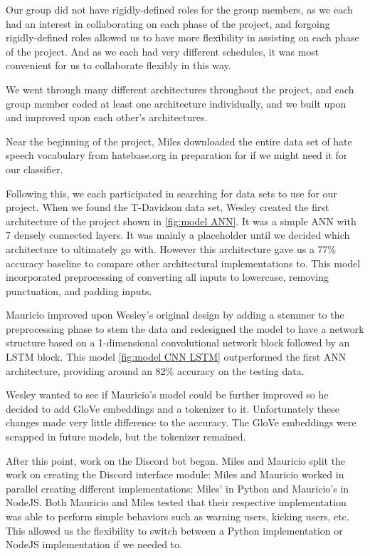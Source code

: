 \documentclass[conference]{sig-alternate-05-2015}
\begin{document}
Our group did not have rigidly-defined roles for the group members, as we each had an interest in collaborating on each phase of the project, and forgoing rigidly-defined roles allowed us to have more flexibility in assisting on each phase of the project. And as we each had very different schedules, it was most convenient for us to collaborate flexibly in this way.

We went through many different architectures throughout the project, and each group member coded at least one architecture individually, and we built upon and improved upon each other's architectures.

Near the beginning of the project, Miles downloaded the entire data set of hate speech vocabulary from hatebase.org in preparation for if we might need it for our classifier.

Following this, we each participated in searching for data sets to use for our project. When we found the T-Davidson data set, Wesley created the first architecture of the project shown in \ref{fig:model ANN}. It was a simple ANN with 7 densely connected layers. It was mainly a placeholder until we decided which architecture to ultimately go with. However this architecture gave us a 77\% accuracy baseline to compare other architectural implementations to. This model incorporated preprocessing of converting all inputs to lowercase, removing punctuation, and padding inputs.

Mauricio improved upon Wesley’s original design by adding a stemmer to the preprocessing phase to stem  the data and redesigned the model to have a network structure based on a 1-dimensional convolutional network block followed by an LSTM block. This model \ref{fig:model CNN LSTM} outperformed the first ANN architecture, providing around an 82\% accuracy on the testing data.

Wesley wanted to see if Mauricio's model could be further improved so he decided to add GloVe embeddings and a tokenizer to it. Unfortunately these changes made very little difference to the accuracy. The GloVe embeddings were scrapped in future models, but the tokenizer remained.

After this point, work on the Discord bot began. Miles and Mauricio split the work on creating the Discord interface module:  Miles and Mauricio worked in parallel creating different implementations: Miles' in Python and Mauricio's in NodeJS. Both Mauricio and Miles tested that their respective implementation was able to perform simple behaviors such as warning users, kicking users, etc. This allowed us the flexibility to switch between a Python implementation or NodeJS implementation if we needed to. 
\end{document}
